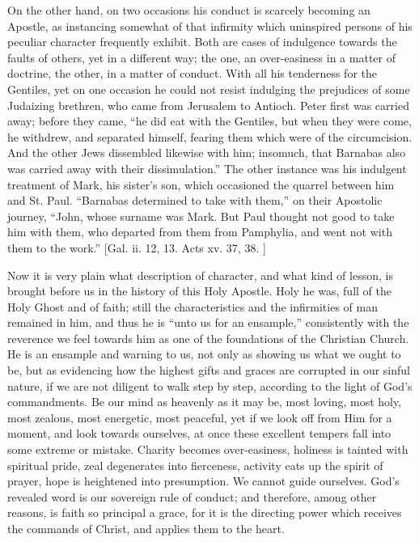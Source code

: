 On the other hand, on two occasions his conduct is scarcely becoming
an Apostle, as instancing somewhat of that infirmity which uninspired
persons of his peculiar character frequently exhibit. Both are cases of
indulgence towards the faults of others, yet in a different way; the
one, an over-easiness in a matter of doctrine, the other, in a matter of
conduct. With all his tenderness for the Gentiles, yet on one occasion
he could not resist indulging the prejudices of some Judaizing brethren,
who came from Jerusalem to Antioch. Peter first was carried away; before
they came, ``he did eat with the Gentiles, but when they were come,
he withdrew, and separated himself, fearing them which were of the
circumcision. And the other Jews dissembled likewise with him; insomuch,
that Barnabas also was carried away with their dissimulation.'' The
other instance was his indulgent treatment of Mark, his sister's son,
which occasioned the quarrel between him and St. Paul. ``Barnabas
determined to take with them,'' on their Apostolic journey,
``John, whose surname was Mark. But Paul thought not good to take
him with them, who departed from them from Pamphylia, and went not with
them to the work.'' [Gal. ii. 12, 13. Acts xv. 37, 38. ]

Now it is very plain what description of character, and what kind of
lesson, is brought before us in the history of this Holy Apostle. Holy
he was, full of the Holy Ghost and of faith; still the characteristics
and the infirmities of man remained in him, and thus he is ``unto us
for an ensample,'' consistently with the reverence we feel towards
him as one of the foundations of the Christian Church. He is an ensample
and warning to us, not only as showing us what we ought to be, but as
evidencing how the highest gifts and graces are corrupted in our sinful
nature, if we are not diligent to walk step by step, according to the
light of God's commandments. Be our mind as heavenly as it may be, most
loving, most holy, most zealous, most energetic, most peaceful, yet if
we look off from Him for a moment, and look towards ourselves, at once
these excellent tempers fall into some extreme or mistake. Charity
becomes over-easiness, holiness is tainted with spiritual pride, zeal
degenerates into fierceness, activity eats up the spirit of prayer, hope
is heightened into presumption. We cannot guide ourselves. God's
revealed word is our sovereign rule of conduct; and therefore, among
other reasons, is faith so principal a grace, for it is the directing
power which receives the commands of Christ, and applies them to the
heart.

